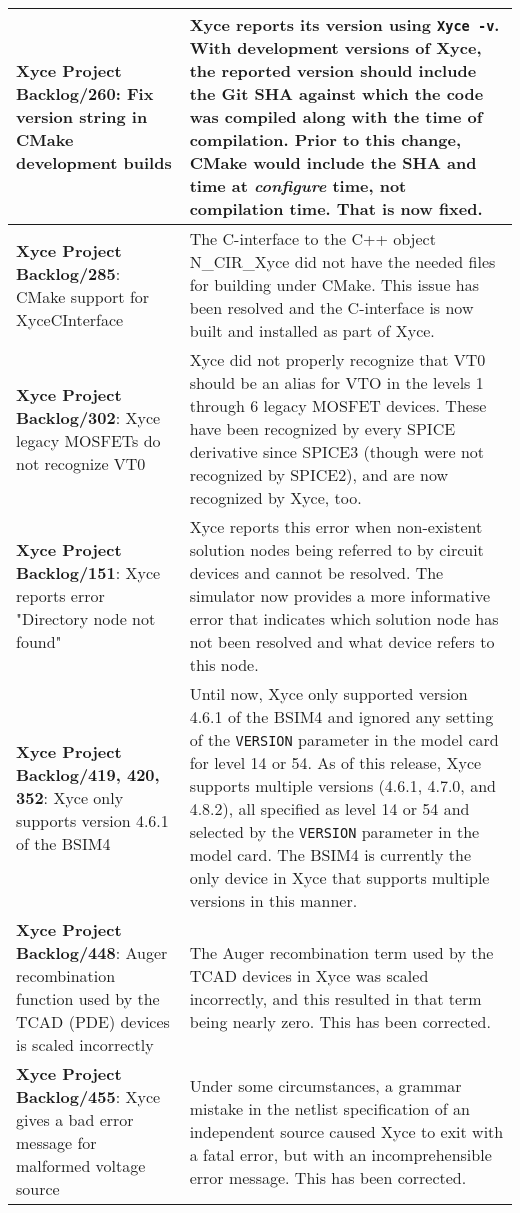 {\begin{longtable}[h] {>{\raggedright\small}m{2in}|>{\raggedright\let\\\tabularnewline\small}m{3.5in}}
\textbf{Xyce Project Backlog/260}: Fix version string in CMake development builds &
Xyce reports its version using \texttt{Xyce -v}.  With development versions of
Xyce, the reported version should include the Git SHA against which the code
was compiled along with the time of compilation. Prior to this change, CMake
would include the SHA and time at \emph{configure} time, not compilation time.
That is now fixed. \\ \hline

\textbf{Xyce Project Backlog/285}: CMake support for XyceCInterface &
The C-interface to the C++ object N\_CIR\_Xyce did not have the needed
files for building under CMake.  This issue has been resolved and the 
C-interface is now built and installed as part of Xyce. \\ \hline

\textbf{Xyce Project Backlog/302}: Xyce legacy MOSFETs do not recognize VT0 &
Xyce did not properly recognize that VT0 should be an alias for VTO in
the levels 1 through 6 legacy MOSFET devices.  These have been
recognized by every SPICE derivative since SPICE3 (though were not
recognized by SPICE2), and are now recognized by Xyce, too. \\ \hline

\textbf{Xyce Project Backlog/151}: Xyce reports error "Directory node not found" &
Xyce reports this error when non-existent solution nodes being referred to
by circuit devices and cannot be resolved.  The simulator now provides a more
informative error that indicates which solution node has not been resolved and
what device refers to this node. \\ \hline

\textbf{Xyce Project Backlog/419, 420, 352}:  Xyce only supports version 4.6.1 of the BSIM4 &
Until now, Xyce only supported version 4.6.1 of the BSIM4 and ignored
any setting of the \texttt{VERSION} parameter in the model card for level
14 or 54.  As of this release, Xyce supports multiple versions (4.6.1,
4.7.0, and 4.8.2), all specified as level 14 or 54 and selected by
the \texttt{VERSION} parameter in the model card.  The BSIM4 is
currently the only device in Xyce that supports multiple versions in
this manner. \\ \hline


\textbf{Xyce Project Backlog/448}:  Auger recombination function used by 
the TCAD (PDE) devices is scaled incorrectly & The Auger recombination term 
used by the TCAD devices in Xyce was scaled incorrectly, and this resulted 
in that term being nearly zero.  This has been corrected.
\\ \hline

\textbf{Xyce Project Backlog/455}:  Xyce gives a bad error message for 
malformed voltage source & Under some circumstances, a grammar mistake 
in the netlist specification of an independent source caused Xyce to 
exit with a fatal error, but with an incomprehensible error message.  
This has been corrected.
\\ \hline

\end{longtable}
}
